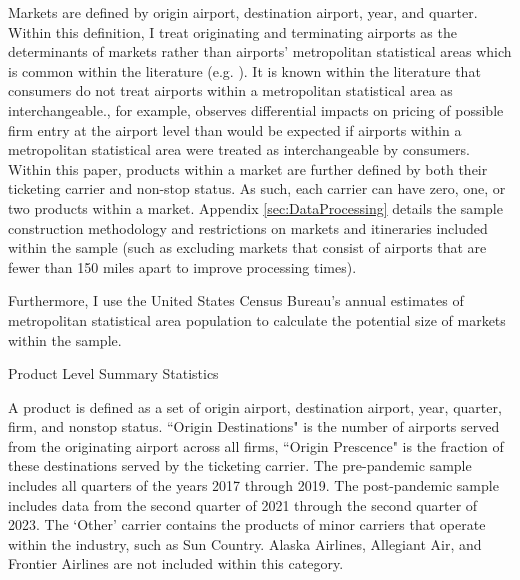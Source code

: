 \documentclass{article}
\begin{document}
	Markets are defined by origin airport, destination airport, year, and quarter. Within this definition, I treat originating and terminating airports as the determinants of markets rather than airports' metropolitan statistical areas which is common within the literature (e.g. \citet{ciliberto_does_2014, luo_price_2014, tan_incumbent_2016,ciliberto_market_2021}). It is known within the literature that consumers do not treat airports within a metropolitan statistical area as interchangeable.\citet{goolsbee_how_2008}, for example, observes differential impacts on pricing of possible firm entry at the airport level than would be expected if airports within a metropolitan statistical area were treated as interchangeable by consumers. Within this paper, products within a market are further defined by both their ticketing carrier and non-stop status. As such, each carrier can have zero, one, or two products within a market. Appendix \ref{sec:DataProcessing} details the sample construction methodology and restrictions on markets and itineraries included within the sample (such as excluding markets that consist of airports that are fewer than 150 miles apart to improve processing times).
	
	Furthermore, I use the United States Census Bureau's annual estimates of metropolitan statistical area population to calculate the potential size of markets within the sample. 
    
    \begin{table}
    \caption{Product Level Summary Statistics}
    \label{tab:Summary_Statistics_Product}
                    \vspace{-15mm}
                    \begin{center}
    
                        \end{center}
                    \vspace{-5mm}
    \footnotesize{A product is defined as a set of origin airport, destination airport, year, quarter, firm, and nonstop status. ``Origin Destinations" is the number of airports served from the originating airport across all firms, ``Origin Prescence" is the fraction of these destinations served by the ticketing carrier. The pre-pandemic sample includes all quarters of the years 2017 through 2019. The post-pandemic sample includes data from the second quarter of 2021 through the second quarter of 2023. The `Other' carrier contains the products of minor carriers that operate within the industry, such as Sun Country. Alaska Airlines, Allegiant Air, and Frontier Airlines are not included within this category.}
    \end{table}
\end{document}
